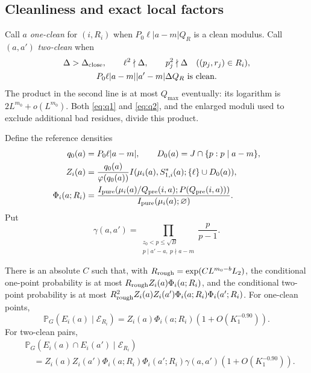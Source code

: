 \subsection{Cleanliness and exact local factors}

Call \(a\) \emph{one-clean} for \((i,R_i)\) when
\(P_0\ell|a-m|Q_R\) is a clean modulus.  Call \((a,a')\)
\emph{two-clean} when
\begin{gather*}
 \Delta>\Delta_{\rm close},\qquad \ell^2\nmid\Delta,
 \qquad p_j^2\nmid\Delta\quad((p_j,r_j)\in R_i),\\
 P_0\ell|a-m||a'-m|\Delta Q_R
       \text{ is clean}.
\end{gather*}
The product in the second line is at most \(Q_{\max}\) eventually:
its logarithm is \(2L^{m_0}+o(L^{m_0})\).
Both \eqref{eq:q1} and \eqref{eq:q2}, and the enlarged moduli used
to exclude additional bad residues, divide this product.

Define the reference densities
\begin{align*}
 q_0(a)&=P_0\ell|a-m|,\qquad D_0(a)=J\cap\{p:p\mid a-m\},\\
 Z_i(a)&=\frac{q_0(a)}{\varphi(q_0(a))}
     I(\mu_i(a),S_{1,i}^*(a);\{\ell\}\cup D_0(a)),\\
 \Phi_i(a;R_i)&=
    \frac{I_{\rm pure}(\mu_i(a)/Q_{\rm pre}(i,a);
                          P(Q_{\rm pre}(i,a)))}
         {I_{\rm pure}(\mu_i(a);\varnothing)}.
\end{align*}
Put
\begin{equation}\label{eq:gamma}
 \gamma(a,a')=
 \prod_{\substack{z_0<p\le\sqrt B\\p\mid a'-a,\ p\nmid a-m}}
                \frac p{p-1}.
\end{equation}

\begin{proposition}\label{prop:conditional}
There is an absolute \(C\) such that, with
\(R_{\rm rough}=\exp(CL^{m_0-b}L_2)\), the conditional one-point
probability is at most
\(R_{\rm rough}Z_i(a)\Phi_i(a;R_i)\), and the conditional
two-point probability is at most
\(R_{\rm rough}^2Z_i(a)Z_i(a')\Phi_i(a;R_i)\Phi_i(a';R_i)\).
For one-clean points,
\[
 \mathbb P_G(E_i(a)\mid\mathcal E_{R_i})
   =Z_i(a)\Phi_i(a;R_i)(1+O(K_1^{-0.90})).
\]
For two-clean pairs,
\begin{align*}
 &\mathbb P_G(E_i(a)\cap E_i(a')\mid\mathcal E_{R_i})\\
 &\quad=Z_i(a)Z_i(a')\Phi_i(a;R_i)\Phi_i(a';R_i)
          \gamma(a,a')(1+O(K_1^{-0.90})).
\end{align*}
\end{proposition}

